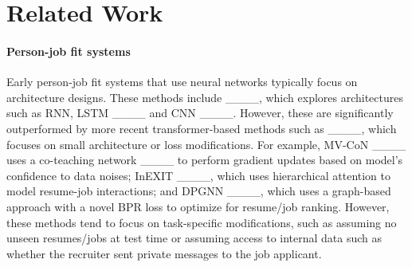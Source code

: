 \section{Related Work}
\label{sec:Related Work}

\paragraph{Person-job fit systems}


Early person-job fit systems that use neural networks typically focus on architecture designs. These methods include ____, which explores
architectures such as RNN, LSTM ____ and CNN ____.
However, these are significantly outperformed by more recent transformer-based methods such as ____, which focuses on small architecture or loss modifications.
For example, MV-CoN ____ uses a co-teaching network ____ to perform gradient updates based on model's confidence to data noises; InEXIT ____, which uses hierarchical attention to model resume-job interactions; and DPGNN ____, which uses a graph-based approach with a novel BPR loss to optimize for resume/job ranking.
However, these methods tend to focus on task-specific modifications, such as assuming no unseen resumes/jobs at test time or assuming access to internal data such as whether the recruiter sent private messages to the job applicant.
